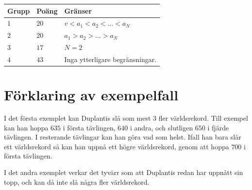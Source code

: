 \noindent
\begin{tabular}{| l | l | p{12cm} |}
  \hline
  \textbf{Grupp} & \textbf{Poäng} & \textbf{Gränser} \\ \hline
  $1$    & $20$       & $v < a_1 < a_2 < \dots < a_N$ \\ \hline
  $2$    & $20$        & $a_1 > a_2 > \dots > a_N$ \\ \hline
  $3$    & $17$        & $N = 2$ \\ \hline
  $4$    & $43$       & Inga ytterligare begränsningar. \\ \hline
\end{tabular}

\section*{Förklaring av exempelfall}

I det första exemplet kan Duplantis slå som mest $3$ fler världsrekord. Till exempel kan han hoppa $635$ i första tävlingen, 
$640$ i andra, och slutligen $650$ i fjärde tävlingen. I resterande tävlingar kan han göra vad som helst. Ifall han bara slår ett 
världsrekord så kan han uppnå ett högre världsrekord, genom att hoppa $700$ i första tävlingen.

I det andra exemplet verkar det tyvärr som att Duplantis redan har uppnått sin topp, och kan då inte slå några fler världsrekord.


